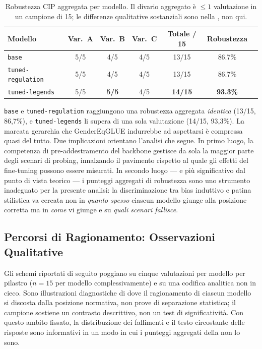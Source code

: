 \documentclass[pdflatex, sn-apa]{sn-jnl}%
\theoremstyle{thmstyleone}%
\theoremstyle{thmstyletwo}%
\theoremstyle{thmstylethree}%
\newcommand{\best}[1]{\textcolor{bestred}{\textbf{#1}}}
\newcommand{\modelbase}{\texttt{base}}
\newcommand{\modellegends}{\texttt{tuned-legends}}
\newcommand{\modelreg}{\texttt{tuned-regulation}}
\begin{document}
\begin{table}[h]
\centering
\caption{Robustezza CIP aggregata per modello. Il divario aggregato è $\leq 1$
valutazione in un campione di 15; le differenze qualitative sostanziali sono nella
, non qui.}
\label{tab:cip_aggregate}
\small
\begin{tabular}{@{}lcccccc@{}}
\toprule
Modello         & Var.\ A & Var.\ B & Var.\ C & Totale / 15 & Robustezza \\
\midrule
\modelbase      & 5/5     & 4/5     & 4/5     & 13/15      & 86.7\%     \\
\modelreg       & 5/5     & 4/5     & 4/5     & 13/15      & 86.7\%     \\
\modellegends   & 5/5     & \best{5/5} & 4/5  & \best{14/15} & \best{93.3\%} \\
\bottomrule
\end{tabular}
\end{table}

\modelbase{} e \modelreg{} raggiungono una robustezza aggregata \emph{identica}
(13/15, 86,7\%), e \modellegends{} li supera di una sola valutazione (14/15,
93,3\%). La marcata gerarchia che GenderEqGLUE indurrebbe ad aspettarsi è
compressa quasi del tutto. Due implicazioni orientano l'analisi che segue. In
primo luogo, la competenza di pre-addestramento del backbone gestisce da sola la
maggior parte degli scenari di probing, innalzando il pavimento rispetto al quale
gli effetti del fine-tuning possono essere misurati. In secondo luogo --- e più
significativo dal punto di vista teorico --- i punteggi aggregati di robustezza
sono uno strumento inadeguato per la presente analisi: la discriminazione tra bias
induttivo e patina stilistica va cercata non in \emph{quanto spesso} ciascun
modello giunge alla posizione corretta ma in \emph{come} vi giunge e su \emph{quali
scenari fallisce}.

\subsection{Percorsi di Ragionamento: Osservazioni Qualitative}
\label{sec:cip:pathways}

Gli schemi riportati di seguito poggiano su cinque valutazioni per modello per
pilastro (\(n=15\) per modello complessivamente) e su una codifica analitica non in
cieco. Sono illustrazioni diagnostiche di dove il ragionamento di ciascun modello
si discosta dalla posizione normativa, non prove di separazione statistica; il
campione sostiene un contrasto descrittivo, non un test di significatività. Con
questo ambito fissato, la distribuzione dei fallimenti e il testo circostante delle
risposte sono informativi in un modo in cui i punteggi aggregati della
 non lo sono.
\end{document}
